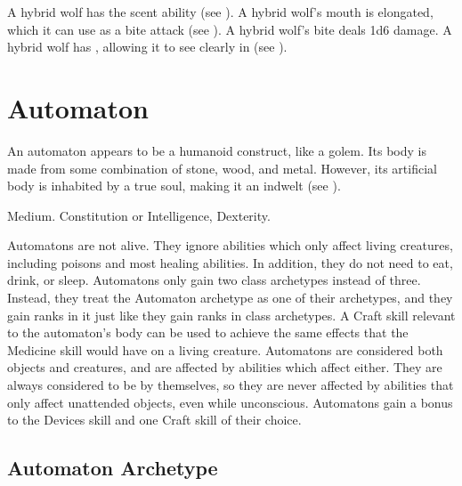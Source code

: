 
    \begin{itemize}
       A hybrid wolf has the scent ability (see ).
       A hybrid wolf's mouth is elongated, which it can use as a bite attack (see ).
        A hybrid wolf's bite deals 1d6 damage.
       A hybrid wolf has , allowing it to see clearly in  (see ).
    \end{itemize}

\section{Automaton}
  An automaton appears to be a humanoid construct, like a golem.
  Its body is made from some combination of stone, wood, and metal.
  However, its artificial body is inhabited by a true soul, making it an indwelt (see ).

   Medium.
    Constitution or Intelligence,  Dexterity.
  \begin{itemize}
     Automatons are not alive. They ignore abilities which only affect living creatures, including poisons and most healing abilities. In addition, they do not need to eat, drink, or sleep.
     Automatons only gain two class archetypes instead of three.
      Instead, they treat the Automaton archetype as one of their archetypes, and they gain ranks in it just like they gain ranks in class archetypes.
     A Craft skill relevant to the automaton's body can be used to achieve the same effects that the Medicine skill would have on a living creature.
     Automatons are considered both objects and creatures, and are affected by abilities which affect either.
      They are always considered to be  by themselves, so they are never affected by abilities that only affect unattended objects, even while unconscious.
     Automatons gain a  bonus to the Devices skill and one Craft skill of their choice.
  \end{itemize}

  \subsection{Automaton Archetype}

